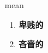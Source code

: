 
\begin{frame}
{\huge mean}
\begin{center}
\begin{enumerate}\Large
  \item \textbf{卑贱的}
  \item \textbf{吝啬的}
\end{enumerate}
\end{center}
\end{frame}
